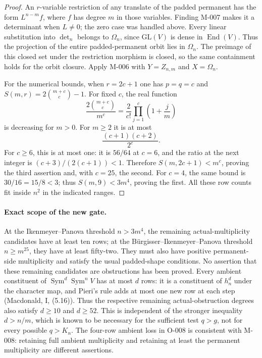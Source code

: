 \begin{proof}
An \(r\)-variable restriction of any translate of the padded
permanent has the form \(L^{n-m}f\), where \(f\) has degree \(m\)
in those variables. Finding M-007 makes it a determinant when
\(L\ne0\); the zero case was handled above.
Every linear substitution into \(\det_n\) belongs to
\(\Omega_n\), since \(\mathrm{GL}(V)\) is dense in
\(\operatorname{End}(V)\). Thus the projection of the entire
padded-permanent orbit lies in \(\Omega_n\).
The preimage of this closed set under the restriction morphism
is closed, so the same containment holds for the orbit closure.
Apply M-006 with \(Y=Z_{n,m}\) and \(X=\Omega_n\).

For the numerical bounds, when \(r=2c+1\) one has
\(p=q=c\) and \(S(m,r)=2\binom{m+c}{c}-1\).
For fixed \(c\), the real function
\[
 \frac{2\binom{m+c}{c}}{m^c}
       =\frac{2}{c!}\prod_{j=1}^c\left(1+\frac jm\right)
\]
is decreasing for \(m>0\).
For \(m\geq2\) it is at most
\[
                  \frac{(c+1)(c+2)}{2^c}.
\]
For \(c\geq6\), this is at most one: it is \(56/64\)
at \(c=6\), and the ratio at the next integer is
\((c+3)/(2(c+1))<1\).
Therefore \(S(m,2c+1)<m^c\), proving the third assertion
and, with \(c=25\), the second.
For \(c=4\), the same bound is \(30/16=15/8<3\);
thus \(S(m,9)<3m^4\), proving the first.
All these row counts fit inside \(n^2\) in the indicated ranges.
\end{proof}

\paragraph{Exact scope of the new gate.}
At the Ikenmeyer--Panova threshold \(n>3m^4\), the remaining
actual-multiplicity candidates have at least ten rows; at the
B\"urgisser--Ikenmeyer--Panova threshold \(n\geq m^{25}\), they
have at least fifty-two. They must also have positive
permanent-side multiplicity and satisfy the usual padded-shape
conditions. No assertion that these remaining candidates are
obstructions has been proved.
Every ambient constituent of \(\operatorname{Sym}^d\operatorname{Sym}^nV\)
has at most \(d\) rows: it is a constituent of \(h_n^d\) under the
character map, and Pieri's rule adds at most one new row at each step
(Macdonald, I, (5.16)). Thus the respective remaining actual-obstruction
degrees also satisfy \(d\geq10\) and \(d\geq52\).
This is independent of the stronger inequality \(d>n/m\), which is
known to be necessary for the sufficient test \(q>g\), not for every
possible \(q>K_n\).
The four-row ambient loss in O-008 is consistent with M-008:
retaining full ambient multiplicity and retaining at least the
permanent multiplicity are different assertions.

